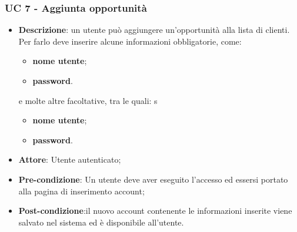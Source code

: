 \subsubsection{UC 7 - Aggiunta opportunità}


\begin{itemize}
	\item \textbf{Descrizione}: un utente può aggiungere un'opportunità alla lista di clienti. Per farlo deve inserire alcune informazioni obbligatorie, come:
	\begin{itemize}
		\item \textbf{nome utente};
		\item \textbf{password}.
	\end{itemize}
	e molte altre facoltative, tra le quali:
	s\begin{itemize}
		\item \textbf{nome utente};
		\item \textbf{password}.
	\end{itemize}
	\item \textbf{Attore}: Utente autenticato;
	\item \textbf{Pre-condizione}: Un utente deve aver eseguito l'accesso ed essersi portato alla pagina di inserimento account;
	\item \textbf{Post-condizione}:il nuovo account contenente le informazioni inserite viene salvato nel sistema ed è disponibile all'utente.
\end{itemize}